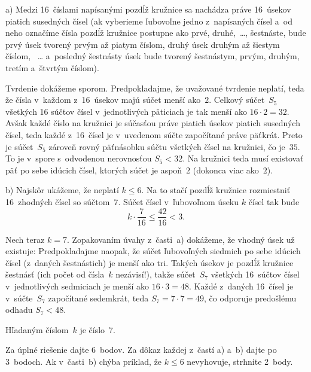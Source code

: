 {%
a) Medzi 16~číslami napísanými pozdĺž kružnice sa
nachádza práve 16~úsekov piatich susedných čísel
(ak vyberieme ľubovoľne jedno z~napísaných čísel a~od neho označíme čísla pozdĺž
kružnice postupne ako prvé, druhé,~\dots, šestnáste, bude prvý úsek tvorený
prvým až piatym číslom, druhý úsek druhým až šiestym číslom,~
\dots{} a~posledný šestnásty úsek bude tvorený šestnástym, prvým, druhým, tretím a~štvrtým číslom).

Tvrdenie dokážeme sporom. Predpokladajme, že uvažované tvrdenie neplatí,
teda že čísla v~každom z~16~úsekov majú súčet menší ako~$2$.
Celkový súčet~$S_5$
všetkých 16 súčtov čísel v~jednotlivých päticiach
je tak menší ako $16\cdot 2=32$.
Avšak každé číslo na kružnici je súčasťou práve piatich úsekov piatich susedných
čísel, teda každé z~16~čísel je v~uvedenom súčte započítané
práve päťkrát.
Preto je súčet~$S_5$ zároveň rovný päťnásobku
súčtu všetkých čísel na kružnici, čo je~$35$. To je v~spore s~odvodenou nerovnosťou
$S_5<32$.
Na kružnici teda musí existovať
päť po sebe idúcich čísel, ktorých súčet je aspoň~$2$ (dokonca viac ako~$2$).

\smallskip
b)
Najskôr ukážeme, že neplatí $k\le6$. Na to stačí
pozdĺž kružnice rozmiestniť 16~zhodných čísel so súčtom~$7$.
Súčet čísel v~ľubovoľnom úseku $k$ čísel tak bude
$$
k\cdot \frac7{16}\le \frac{42}{16}<3.
$$

Nech teraz $k=7$. Zopakovaním úvahy z~časti~a) dokážeme, že vhodný úsek už
existuje: Predpokladajme naopak,
že súčet ľubovoľných siedmich po sebe idúcich čísel
(z~daných šestnástich) je menší ako tri.
Takých úsekov je pozdĺž kružnice šestnásť (ich počet od čísla~$k$ nezávisí!),
takže súčet~$S_7$ všetkých 16~súčtov čísel v~jednotlivých sedmiciach
je menší ako $16\cdot3=48$. Každé z~daných 16~čísel je v~súčte~$S_7$
započítané sedemkrát, teda $S_7=7\cdot 7=49$, čo odporuje predošlému odhadu $S_7<48$.

Hľadaným číslom~$k$ je číslo~$7$.

\nobreak\medskip\petit\noindent
Za úplné riešenie dajte 6~bodov.
Za dôkaz každej z~častí a) a~b) dajte po 3~bodoch. Ak v~časti~b) chýba
príklad, že $k\le6$ nevyhovuje, strhnite 2~body.
\endpetit
\bigbreak
}

